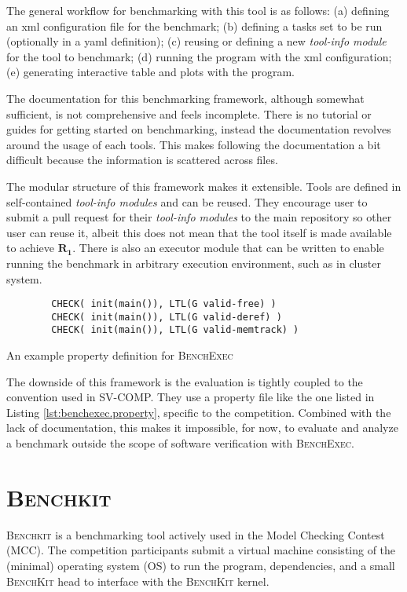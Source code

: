 The general workflow for benchmarking with this tool is as follows:
(a) defining an xml configuration file for the benchmark;
(b) defining a tasks set to be run (optionally in a yaml definition);
(c) reusing or defining a new \textit{tool-info module} for the tool to benchmark;
(d) running the  program with the xml configuration;
(e) generating interactive table and plots with the  program.

The documentation for this benchmarking framework, although somewhat sufficient, is not comprehensive and feels incomplete.
There is no tutorial or guides for getting started on benchmarking, instead the documentation revolves around the usage of each tools.
This makes following the documentation a bit difficult because the information is scattered across files.

The modular structure of this framework makes it extensible.
Tools are defined in self-contained \textit{tool-info modules} and can be reused.
They encourage user to submit a pull request for their \textit{tool-info modules} to the main repository so other user can reuse it, albeit this does not mean that the tool itself is made available to achieve $\bm{R_1}$.
There is also an executor module that can be written to enable running the benchmark in arbitrary execution environment, such as in cluster system.

\begin{listing}
	\begin{verbatim}
		CHECK( init(main()), LTL(G valid-free) )
		CHECK( init(main()), LTL(G valid-deref) )
		CHECK( init(main()), LTL(G valid-memtrack) )
	\end{verbatim}
	\caption{An example property definition for \textsc{BenchExec}}
	\label{lst:benchexec.property}
\end{listing}

The downside of this framework is the evaluation is tightly coupled to the convention used in SV-COMP.
They use a property file like the one listed in Listing \ref{lst:benchexec.property}, specific to the competition.
Combined with the lack of documentation, this makes it impossible, for now, to evaluate and analyze a benchmark outside the scope of software verification with \textsc{BenchExec}.


\section{\textsc{Benchkit}}

\textsc{Benchkit} \citep{benchkit:2013} is a benchmarking tool actively used in the Model Checking Contest (MCC).
The competition participants submit a virtual machine consisting of the (minimal) operating system (OS) to run the program, dependencies, and a small \textsc{BenchKit} head to interface with the \textsc{BenchKit} kernel.

